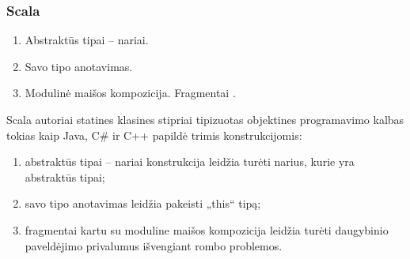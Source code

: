 \begin{frame}
  \frametitle{Scala}
  \begin{enumerate}
    \item Abstraktūs tipai – nariai.
    \item Savo tipo anotavimas.
    \item Modulinė maišos kompozicija. Fragmentai .
  \end{enumerate}
  \begin{handout}
    Scala autoriai statines klasines stipriai tipizuotas objektines
    programavimo kalbas tokias kaip Java, C\# ir C++ papildė trimis
    konstrukcijomis:
    \begin{enumerate}
      \item abstraktūs tipai – nariai konstrukcija leidžia turėti
        narius, kurie yra abstraktūs tipai;
      \item savo tipo anotavimas leidžia pakeisti „this“ tipą;
      \item fragmentai kartu su moduline maišos kompozicija leidžia
        turėti daugybinio paveldėjimo privalumus išvengiant
        rombo problemos.
    \end{enumerate}
  \end{handout}
\end{frame}


